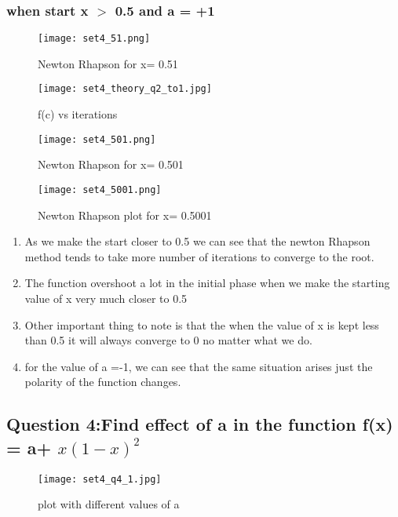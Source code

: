 \documentclass[a4paper]{article}
\begin{document}
    \subsubsection{when start x $>$ 0.5 and a = +1}
        \begin{figure}[!htbp]
          \centering
          \begin{minipage}[b]{0.45\textwidth}
\texttt{[image: set4\_51.png]}
            \caption{Newton Rhapson for x= 0.51 }
          \end{minipage}
          \hfill
          \begin{minipage}[b]{0.45\textwidth}
            \texttt{[image: set4\_theory\_q2\_to1.jpg]}
            \caption{f(c) vs iterations}
          \end{minipage}
        \end{figure}
         \begin{figure}[!htbp]
          \centering
          \begin{minipage}[b]{0.45\textwidth}
\texttt{[image: set4\_501.png]}
            \caption{Newton Rhapson for x= 0.501 }
          \end{minipage}
          \hfill
          \begin{minipage}[b]{0.45\textwidth}
            \texttt{[image: set4\_5001.png]}
            \caption{Newton Rhapson plot for x= 0.5001}
          \end{minipage}
        \end{figure}
        \begin{enumerate}
        \newpage
        \item As we make the start closer to 0.5 we can see that the newton Rhapson method tends to take more number of iterations to converge to the root.
        \item The function overshoot a lot in the initial phase when we make the starting value of x very much closer to 0.5
        \item Other important thing to note is that the when the value of x is kept less than 0.5 it will always converge to 0 no matter what we do.
        \item for the value of a =-1, we can see that the same situation arises just the polarity of the function changes.
        \end{enumerate}
        
        
        \newpage
        \subsection{Question 4:Find effect of a in the function f(x) = a+ $x(1-x)^2$}
        \begin{figure}[!htbp]
          \centering
          \texttt{[image: set4\_q4\_1.jpg]}
            \caption{plot with different values of a }
          \end{figure}
        
\end{document}
